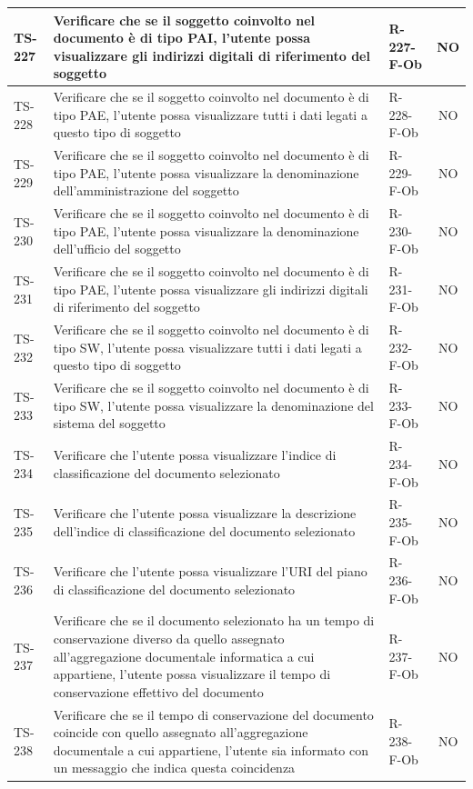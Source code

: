 \documentclass[a4paper,12pt]{article}
\begin{document}
\begin{longtable}{|p{1.5cm}|p{8.3cm}|p{2.4cm}|c|}
\hline
TS-227 & Verificare che se il soggetto coinvolto nel documento è di tipo PAI, l'utente possa visualizzare gli indirizzi digitali di riferimento del soggetto & R-227-F-Ob & NO \\
\hline
TS-228 & Verificare che se il soggetto coinvolto nel documento è di tipo PAE, l'utente possa visualizzare tutti i dati legati a questo tipo di soggetto & R-228-F-Ob & NO \\
\hline
TS-229 & Verificare che se il soggetto coinvolto nel documento è di tipo PAE, l'utente possa visualizzare la denominazione dell'amministrazione del soggetto & R-229-F-Ob & NO \\
\hline
TS-230 & Verificare che se il soggetto coinvolto nel documento è di tipo PAE, l'utente possa visualizzare la denominazione dell'ufficio del soggetto & R-230-F-Ob & NO \\
\hline
TS-231 & Verificare che se il soggetto coinvolto nel documento è di tipo PAE, l'utente possa visualizzare gli indirizzi digitali di riferimento del soggetto & R-231-F-Ob & NO \\
\hline
TS-232 & Verificare che se il soggetto coinvolto nel documento è di tipo SW, l'utente possa visualizzare tutti i dati legati a questo tipo di soggetto & R-232-F-Ob & NO \\
\hline
TS-233 & Verificare che se il soggetto coinvolto nel documento è di tipo SW, l'utente possa visualizzare la denominazione del sistema del soggetto & R-233-F-Ob & NO \\
\hline
TS-234 & Verificare che l'utente possa visualizzare l'indice di classificazione del documento selezionato & R-234-F-Ob & NO \\
\hline
TS-235 & Verificare che l'utente possa visualizzare la descrizione dell'indice di classificazione del documento selezionato & R-235-F-Ob & NO \\
\hline
TS-236 & Verificare che l'utente possa visualizzare l'URI del piano di classificazione del documento selezionato & R-236-F-Ob & NO \\
\hline
TS-237 & Verificare che se il documento selezionato ha un tempo di conservazione diverso da quello assegnato all'aggregazione documentale informatica a cui appartiene, l'utente possa visualizzare il tempo di conservazione effettivo del documento & R-237-F-Ob  & NO \\
\hline
TS-238 & Verificare che se il tempo di conservazione del documento coincide con quello assegnato all'aggregazione documentale a cui appartiene, l'utente sia informato con un messaggio che indica questa coincidenza & R-238-F-Ob & NO \\

\end{longtable}
\end{document}
